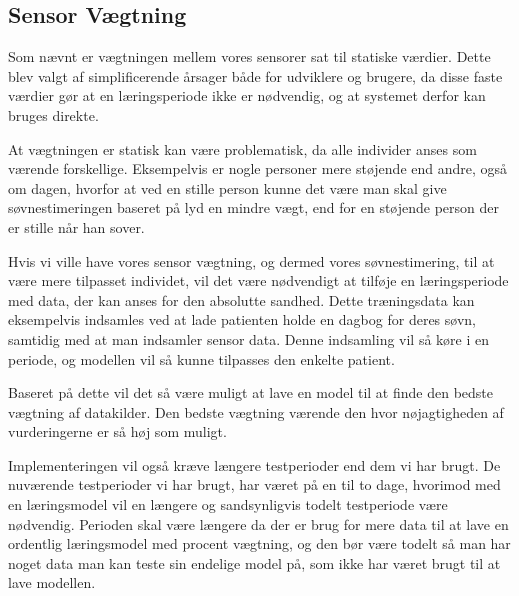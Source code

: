 \subsection{Sensor Vægtning}\label{subsec:sensorvaegtsoevn}
Som nævnt er vægtningen mellem vores sensorer sat til statiske værdier.
Dette blev valgt af simplificerende årsager både for udviklere og brugere, da disse faste værdier gør at en læringsperiode ikke er nødvendig, og at systemet derfor kan bruges direkte.

At vægtningen er statisk kan være problematisk, da alle individer anses som værende forskellige. 
Eksempelvis er nogle personer mere støjende end andre, også om dagen, hvorfor at ved en stille person kunne det være man skal give søvnestimeringen baseret på lyd en mindre vægt, end for en støjende person der er stille når han sover.

Hvis vi ville have vores sensor vægtning, og dermed vores søvnestimering, til at være mere tilpasset individet, vil det være nødvendigt at tilføje en læringsperiode med data, der kan anses for den absolutte sandhed.
Dette træningsdata kan eksempelvis indsamles ved at lade patienten holde en dagbog for deres søvn, samtidig med at man indsamler sensor data.
Denne indsamling vil så køre i en periode, og modellen vil så kunne tilpasses den enkelte patient.

Baseret på dette vil det så være muligt at lave en model til at finde den bedste vægtning af datakilder.
Den bedste vægtning værende den hvor nøjagtigheden af vurderingerne er så høj som muligt.

Implementeringen vil også kræve længere testperioder end dem vi har brugt.
De nuværende testperioder vi har brugt, har været på en til to dage, hvorimod med en læringsmodel vil en længere og sandsynligvis todelt testperiode være nødvendig.
Perioden skal være længere da der er brug for mere data til at lave en ordentlig læringsmodel med procent vægtning, og den bør være todelt så man har noget data man kan teste sin endelige model på, som ikke har været brugt til at lave modellen.
